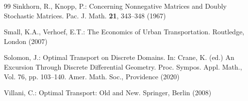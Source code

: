 \documentclass[smallextended,referee,envcountsect,]{svjour3}
\begin{document}
\begin{thebibliography}{99}
Sinkhorn, R., Knopp, P.:
Concerning Nonnegative Matrices and Doubly Stochastic Matrices.
Pac. J. Math. \textbf{21}, 343--348 (1967)

Small, K.A., Verhoef, E.T.:
The Economics of Urban Transportation.
Routledge, London (2007)

Solomon, J.:
Optimal Transport on Discrete Domains.
In: Crane, K. (ed.)
An Excursion Through Discrete Differential Geometry.
Proc. Sympos. Appl. Math., Vol. 76, pp. 103--140.
Amer. Math. Soc., Providence (2020)

Villani, C.:
Optimal Transport: Old and New.
Springer, Berlin (2008)

\end{thebibliography}
\end{document}
